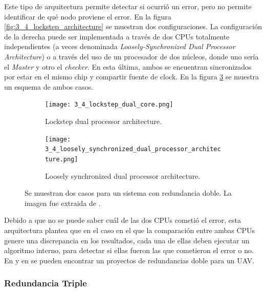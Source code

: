 Este tipo de arquitectura permite detectar si ocurrió un error, pero no permite identificar de qué nodo proviene el error. En la figura \ref{fig:3_4_lockstep_architecture} se muestran dos configuraciones. La configuración de la derecha puede ser implementada a través de dos CPUs totalmente independientes (a veces denominada \textit{Loosely-Synchronized Dual Processor Architecture}) o a través del uso de un procesador de dos núcleos, donde uno sería el \textit{Master} y otro el \textit{checker}\cite{baleani2003fault}. En esta última, ambos se encuentran sincronizados por estar en el mismo chip y compartir fuente de clock. En la figura \ref{fig:3_4_lockstep_architecture_2} se muestra un esquema de ambos casos.

\begin{figure}[H]
    \centering
    \begin{subfigure}[b]{0.49\textwidth}
        \texttt{[image: 3\_4\_lockstep\_dual\_core.png]}
        \caption{Lockstep dual processor architecture.}
        \label{fig:3_4_lockstep_dual_core}
    \end{subfigure}
    \begin{subfigure}[b]{0.49\textwidth}
        \texttt{[image: 3\_4\_loosely\_synchronized\_dual\_processor\_architecture.png]}
        \caption{Loosely synchronized dual processor architecture.}
        \label{fig:3_4_loosely_synchronized_dual_processor_architecture}
    \end{subfigure}
    \caption{Se muestran dos casos para un sistema con redundancia doble. La imagen fue extraida de \cite{baleani2003fault}.}
    \label{fig:3_4_lockstep_architecture_2}
\end{figure}

Debido a que no se puede saber cuál de las dos CPUs cometió el error, esta arquitectura plantea que en el caso en el que la comparación entre ambas CPUs genere una discrepancia en los resultados, cada una de ellas deben ejecutar un algoritmo interno, para detectar si ellas fueron las que cometieron el error o no. En \cite{zhang2015dual} y en \cite{SolanoPerez2019} se pueden encontrar un proyectos de redundancias doble para un UAV.

\subsubsection{Redundancia Triple}

